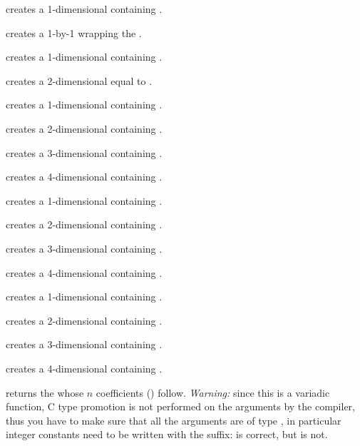  creates a 1-dimensional  containing
.

 creates a 1-by-1  wrapping the 
.

 creates a 1-dimensional  containing
.

 creates a 2-dimensional  equal
to \kbd{[x,y]}.

 creates a 1-dimensional 
containing .

 creates a 2-dimensional 
containing .

 creates a 3-dimensional 
containing .

 creates a 4-dimensional
 containing .

 creates a 1-dimensional 
containing .

 creates a 2-dimensional 
containing .

 creates a 3-dimensional 
containing .

 creates a 4-dimensional
 containing .

 creates a 1-dimensional 
containing .

 creates a 2-dimensional 
containing \kbd{[x, y]}.

 creates a 3-dimensional
 containing \kbd{[x, y, z]}.

 creates a 4-dimensional
 containing \kbd{[x, y, z, t]}.

 returns the  whose $n$
coefficients () follow.
\emph{Warning:} since this is a variadic function, C type promotion is not
performed on the arguments by the compiler, thus you have to make sure that all
the arguments are of type , in particular integer constants need to
be written with the  suffix:  is correct,
but  is not.

